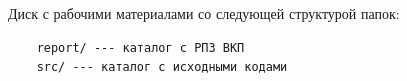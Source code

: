 
Диск с рабочими материалами со следующей структурой папок:
\begin{verbatim}
    report/ --- каталог с РПЗ ВКП
    src/ --- каталог с исходными кодами 
\end{verbatim}

\clearpage